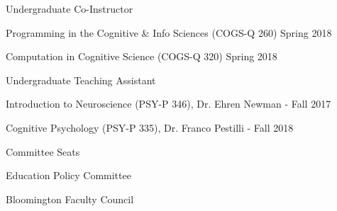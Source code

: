 \begin{cvpubentries}


  \cvpubentry
    {Undergraduate Co-Instructor} %
    { } %
    { } %
    { } %
    {
      \begin{cvpubitems} %
        \item{Programming in the Cognitive \& Info Sciences (COGS-Q 260) Spring 2018}
	\item{Computation in Cognitive Science (COGS-Q 320) Spring 2018}
      \end{cvpubitems}
    }
  \cvpubentry
    {Undergraduate Teaching Assistant} %
    {} %
    {} %
    {} %
    {
      \begin{cvpubitems} %
        \item {Introduction to Neuroscience (PSY-P 346), Dr. Ehren Newman - Fall 2017}
	\item {Cognitive Psychology (PSY-P 335), Dr. Franco Pestilli - Fall 2018}
      \end{cvpubitems}
    }

\cvpubentry
    {Committee Seats} %
    {} %
    {} %
    {} %
    {
      \begin{cvpubitems} %
        \item {Education Policy Committee}
	\item{Bloomington Faculty Council}
      \end{cvpubitems}
    }

\end{cvpubentries}
